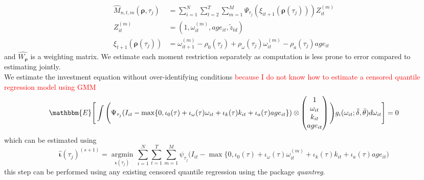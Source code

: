 \documentclass{article}
\begin{document}
\begin{enumerate}
\begin{equation*}
\begin{split}
     \hat{M}_{n,t,m}(\boldsymbol\rho, \tau_{j})&=\sum_{i=1}^{N}\sum_{t=2}^{T}\sum_{m=1}^{M}\Psi_{\tau_{j}}(\xi_{it+1}(\boldsymbol\rho(\tau_{j})))Z_{it}^{(m)}\\
     Z_{it}^{(m)}&=(1, \omega_{it}^{(m)}, age_{it}, \tilde{z}_{td})\\
     \xi_{t+1}(\boldsymbol\rho(\tau_{j}))&=\omega_{it+1}^{(m)}-\rho_{0}(\tau_{j})+\rho_{\omega}(\tau_{j})\omega_{it}^{(m)}-\rho_{a}(\tau_{j})age_{it}
     \end{split}
     \end{equation*}
     and $\hat{W_{\boldsymbol\rho}}$ is a weighting matrix. We estimate each moment restriction separately as computation is less prone to error compared to estimating jointly. \\

     We estimate the investment equation without over-identifying conditions \textcolor{red}{because I do not know how to estimate a censored quantile regression model using GMM}
     \begin{equation}\label{iimc}
     \mathbbm{E}\Bigg[\int\Bigg(\Psi_{\tau_{j}}(I_{it}-\max\{0, \iota_{0}(\tau)+\iota_{\omega}(\tau)\omega_{it}+\iota_{k}(\tau)k_{it}+\iota_{a}(\tau)age_{it}\})\otimes
     \begin{pmatrix}
     1\\
     \omega_{it}\\
     k_{it}\\
     age_{it}
     \end{pmatrix}
     \Bigg) g_{i}(\omega_{it};\bar{\delta},\bar{\theta})d\omega_{it}
     \Bigg]=0
     \end{equation}
     which can be estimated using
     \begin{equation}\label{iobjective}
      \hat{\boldsymbol\iota}(\tau_{j})^{(s+1)}=\underset{\boldsymbol\iota(\tau_{j})}{\operatorname{argmin}}\,\sum_{i=1}^{N}\sum_{t=1}^{T}\sum_{m=1}^{M}\psi_{\tau_{j}}\Bigg(I_{it}-\max\{0, \iota_{0}(\tau)+\iota_{\omega}(\tau)\omega_{it}^{(m)}+\iota_{k}(\tau)k_{it}+\iota_{a}(\tau)age_{it}\Bigg)
     \end{equation}
     this step can be performed using any existing censored quantile regression using the package \textit{quantreg}.\\


\end{enumerate}
\end{document}
